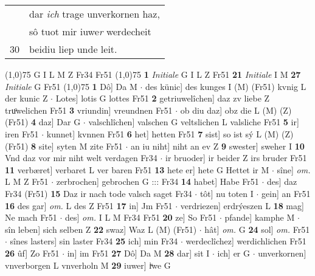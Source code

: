 \documentclass[8pt,a4paper,notitlepage]{article}
\begin{document}
\begin{table}[ht]
\begin{minipage}[t]{0.5\linewidth}
\begin{tabular}{rl}
 & dar \textit{ich} trage unverkornen haz,\\ 
 & sô tuot mir iuwe\textit{r} werdecheit\\ 
30 & beidiu liep unde leit.\\ 
\end{tabular}
\scriptsize
\line(1,0){75} \newline
G I L M Z Fr34 Fr51 \newline
\line(1,0){75} \newline
\textbf{1} \textit{Initiale} G I L Z Fr51  \textbf{21} \textit{Initiale} I M  \textbf{27} \textit{Initiale} G Fr51  \newline
\line(1,0){75} \newline
\textbf{1} Dô] Da M  $\cdot$ des künic] des kunges I (M) (Fr51) kvnig L der kunic Z  $\cdot$ Lotes] lotis G lottes Fr51 \textbf{2} getriuwelîchen] daz zv liebe Z truͦwelichen Fr51 \textbf{3} vriundin] vreundnen Fr51  $\cdot$ ob diu daz] obz die L (M) (Z) (Fr51) \textbf{4} daz] Dar G  $\cdot$ valschlîchen] valschen G veltslichen L valsliche Fr51 \textbf{5} ir] iren Fr51  $\cdot$ kunnet] kvnnen Fr51 \textbf{6} het] hetten Fr51 \textbf{7} sist] so ist sý L (M) (Z) (Fr51) \textbf{8} site] syten M zite Fr51  $\cdot$ an iu niht] niht an ev Z \textbf{9} swester] sweher I \textbf{10} Vnd daz vor mir niht welt verdagen Fr34  $\cdot$ ir bruoder] ir beider Z irs bruder Fr51 \textbf{11} verbæret] verbaret L ver baren Fr51 \textbf{13} hete er] hete G Hettet ir M  $\cdot$ sîne] \textit{om.} L M Z Fr51  $\cdot$ zerbrochen] gebrochen G ::: Fr34 \textbf{14} habet] Habe Fr51  $\cdot$ des] daz Fr34 (Fr51) \textbf{15} Daz ir nach tode valsch saget Fr34  $\cdot$ tôt] nu toten I  $\cdot$ gein] an Fr51 \textbf{16} des gar] \textit{om.} L des Z Fr51 \textbf{17} in] Jm Fr51  $\cdot$ verdriezen] erdrýeszen L \textbf{18} mag] Ne mach Fr51  $\cdot$ des] \textit{om.} I L M Fr34 Fr51 \textbf{20} ze] So Fr51  $\cdot$ pfande] kamphe M  $\cdot$ sîn leben] sich selben Z \textbf{22} swaz] Waz L (M) (Fr51)  $\cdot$ hât] \textit{om.} G \textbf{24} sol] \textit{om.} Fr51  $\cdot$ sînes lasters] sin laster Fr34 \textbf{25} ich] min Fr34  $\cdot$ werdeclîchez] werdichlichen Fr51 \textbf{26} ûf] Zo Fr51  $\cdot$ in] im Fr51 \textbf{27} Dô] Da M \textbf{28} dar] sit I  $\cdot$ ich] er G  $\cdot$ unverkornen] vnverborgen L vnverholn M \textbf{29} iuwer] iͮwe G \newline
\end{minipage}
\hspace{0.5cm}
\begin{minipage}[t]{0.5\linewidth}

\end{minipage}
\end{table}
\end{document}
